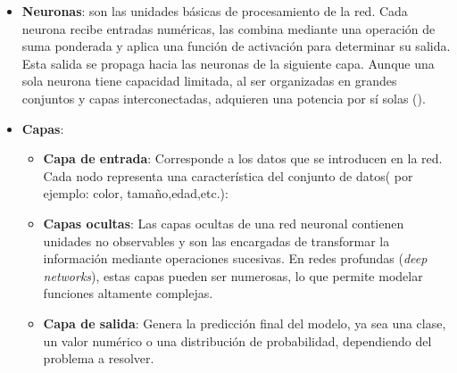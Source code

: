 \documentclass[11pt]{article} %
\begin{document}
\begin{itemize}
    \item\textbf{Neuronas}: son las unidades básicas de procesamiento de la red. Cada neurona recibe entradas numéricas, las combina mediante una operación de suma ponderada y aplica una función de activación para determinar su salida. Esta salida se propaga hacia las neuronas de la siguiente capa. Aunque una sola neurona tiene capacidad limitada, al ser organizadas en grandes conjuntos y capas interconectadas, adquieren una potencia por sí solas (\cite{datacamp_redes}).

    \item\textbf{Capas}:
    \begin{itemize}
        \item \textbf{Capa de entrada}: Corresponde a los datos que se introducen en la red. Cada nodo representa una característica del conjunto de datos( por ejemplo: color, tamaño,edad,etc.):
        \item\textbf{Capas ocultas}: Las capas ocultas de una red neuronal contienen unidades no observables y son las encargadas de transformar la información mediante operaciones sucesivas. En redes profundas (\textit{deep networks}), estas capas pueden ser numerosas, lo que permite modelar funciones altamente complejas.
        \item\textbf{Capa de salida}: Genera la predicción final del modelo, ya sea una clase, un valor numérico o una distribución de probabilidad, dependiendo del problema a resolver.
    \end{itemize}


\end{itemize}
\end{document}
